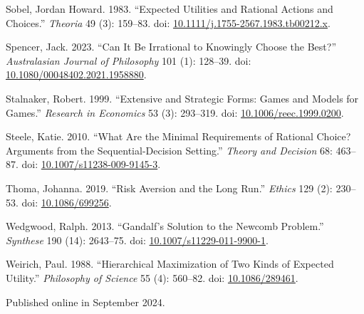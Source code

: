 \documentclass[
  10pt,
  letterpaper,
  DIV=11,
  numbers=noendperiod,
  twoside]{scrartcl}
\newlength{\cslhangindent}
\newenvironment{CSLReferences}[2] %
 {\begin{list}{}{%
  \setlength{\itemindent}{0pt}
  \setlength{\leftmargin}{0pt}
  \setlength{\parsep}{0pt}
  \ifodd #1
   \setlength{\leftmargin}{\cslhangindent}
   \setlength{\itemindent}{-1\cslhangindent}
  \fi
  \setlength{\itemsep}{#2\baselineskip}}}
 {\end{list}}
\begin{document}
\begin{CSLReferences}{1}{0}
Sobel, Jordan Howard. 1983. {``Expected Utilities and Rational Actions
and Choices.''} \emph{Theoria} 49 (3): 159--83. doi:
\href{https://doi.org/10.1111/j.1755-2567.1983.tb00212.x}{10.1111/j.1755-2567.1983.tb00212.x}.

Spencer, Jack. 2023. {``Can It Be Irrational to Knowingly Choose the
Best?''} \emph{Australasian Journal of Philosophy} 101 (1): 128--39.
doi:
\href{https://doi.org/10.1080/00048402.2021.1958880}{10.1080/00048402.2021.1958880}.

Stalnaker, Robert. 1999. {``Extensive and Strategic Forms: Games and
Models for Games.''} \emph{Research in Economics} 53 (3): 293--319. doi:
\href{https://doi.org/10.1006/reec.1999.0200}{10.1006/reec.1999.0200}.

Steele, Katie. 2010. {``What Are the Minimal Requirements of Rational
Choice? Arguments from the Sequential-Decision Setting.''} \emph{Theory
and Decision} 68: 463--87. doi:
\href{https://doi.org/10.1007/s11238-009-9145-3}{10.1007/s11238-009-9145-3}.

Thoma, Johanna. 2019. {``Risk Aversion and the Long Run.''}
\emph{Ethics} 129 (2): 230--53. doi:
\href{https://doi.org/10.1086/699256}{10.1086/699256}.

Wedgwood, Ralph. 2013. {``Gandalf's Solution to the Newcomb Problem.''}
\emph{Synthese} 190 (14): 2643--75. doi:
\href{https://doi.org/10.1007/s11229-011-9900-1}{10.1007/s11229-011-9900-1}.

Weirich, Paul. 1988. {``Hierarchical Maximization of Two Kinds of
Expected Utility.''} \emph{Philosophy of Science} 55 (4): 560--82. doi:
\href{https://doi.org/10.1086/289461}{10.1086/289461}.

\end{CSLReferences}



\noindent Published online in September 2024.
\end{document}
